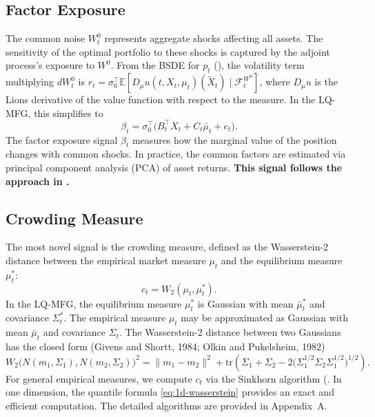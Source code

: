 \subsection{Factor Exposure}
\label{sec:alpha-factor}

The common noise $W_t^0$ represents aggregate shocks affecting all assets. The
sensitivity of the optimal portfolio to these shocks is captured by the adjoint
process's exposure to $W^0$. From the BSDE for $p_t$ (), the
volatility term multiplying $dW_t^0$ is $r_t = \sigma_0^\top \mathbb{E}[D_\mu
u(t,X_t,\mu_t)(\widetilde{X}_t) \mid \mathcal{F}_t^{W^0}]$, where $D_\mu u$ is the
Lions derivative of the value function with respect to the measure. In the LQ-MFG,
this simplifies to
\begin{equation}
    \beta_t = \sigma_0^\top \big( B_t^\top X_t + C_t \bar\mu_t + e_t \big).
    \label{eq:alpha-factor-exposure}
\end{equation}
The factor exposure signal $\beta_t$ measures how the marginal value of the
position changes with common shocks. In practice, the common factors are estimated
via principal component analysis (PCA) of asset returns. \textbf{This signal
follows the approach in \citep{lehallemouzouni2019}.}

\subsection{Crowding Measure}
\label{sec:alpha-crowding}

The most novel signal is the crowding measure, defined as the Wasserstein-2
distance between the empirical market measure $\mu_t$ and the equilibrium measure
$\mu_t^*$:
\begin{equation}
    c_t = W_2(\mu_t, \mu_t^*).
    \label{eq:alpha-crowding-measure}
\end{equation}
In the LQ-MFG, the equilibrium measure $\mu_t^*$ is Gaussian with mean $\bar\mu_t^*$
and covariance $\Sigma_t^*$. The empirical measure $\mu_t$ may be approximated as
Gaussian with mean $\bar\mu_t$ and covariance $\Sigma_t$. The Wasserstein-2 distance
between two Gaussians has the closed form (Givens and Shortt, 1984; Olkin and
Pukelsheim, 1982)
\begin{equation}
    W_2\big( N(m_1,\Sigma_1), N(m_2,\Sigma_2) \big)^2 = \|m_1 - m_2\|^2 +
    \mathrm{tr}\left( \Sigma_1 + \Sigma_2 - 2\big(\Sigma_1^{1/2} \Sigma_2
    \Sigma_1^{1/2}\big)^{1/2} \right).
    \label{eq:alpha-wasserstein-gaussian}
\end{equation}
For general empirical measures, we compute $c_t$ via the Sinkhorn algorithm (\citep{cuturi2013}. In one dimension, the quantile formula \eqref{eq:1d-wasserstein} provides an
exact and efficient computation. The detailed algorithms are provided in
Appendix~A.

